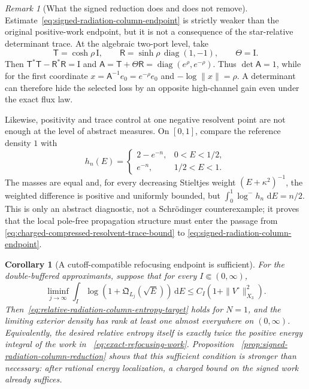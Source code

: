 \documentclass[11pt]{article}
\newcommand{\Id}{\mathrm I}
\newcommand{\dd}{\,\mathrm d}
\newtheorem{corollary}[theorem]{Corollary}
\theoremstyle{definition}
\theoremstyle{remark}
\newtheorem{remark}[theorem]{Remark}
\begin{document}
\begin{remark}[What the signed reduction does and does not remove]
\label{rem:signed-vector-versus-determinant}
Estimate~\eqref{eq:signed-radiation-column-endpoint} is strictly weaker than
the original positive-work endpoint, but it is not a consequence of the
star-relative determinant trace.  At the algebraic two-port level, take
\begin{equation}
 \mathsf T=\cosh\rho\,\Id,
 \qquad
 \mathsf R=\sinh\rho\,\operatorname{diag}(1,-1),
 \qquad \Theta=\Id.
\end{equation}
Then $\mathsf T^*\mathsf T-\mathsf R^*\mathsf R=\Id$ and
$\mathsf A=\mathsf T+\Theta\mathsf R=\operatorname{diag}(e^\rho,e^{-\rho})$.
Thus $\det\mathsf A=1$, while for the first coordinate
$x=\mathsf A^{-1}e_0=e^{-\rho}e_0$ and
$-\log\|x\|=\rho$.  A determinant can therefore hide the selected loss by an
opposite high-channel gain even under the exact flux law.

Likewise, positivity and trace control at one negative resolvent point are not
enough at the level of abstract measures.  On $[0,1]$, compare the reference
density $1$ with
\begin{equation}
 h_n(E)=
 \begin{cases}
  2-e^{-n},&0<E<1/2,\\
  e^{-n},&1/2<E<1.
 \end{cases}
\end{equation}
The masses are equal and, for every decreasing Stieltjes weight
$(E+\kappa^2)^{-1}$, the weighted difference is positive and uniformly
bounded, but $\int_0^1\log^-h_n\,\dd E=n/2$.  This is only an abstract
diagnostic, not a Schr\"odinger counterexample; it proves that the local
pole-free propagation structure must enter the passage from
\eqref{eq:charged-compressed-resolvent-trace-bound} to
\eqref{eq:signed-radiation-column-endpoint}.
\end{remark}

\begin{corollary}[A cutoff-compatible refocusing endpoint is sufficient]
\label{cor:reciprocal-refocusing-endpoint}
For the double-buffered approximants, suppose that for every
$I\Subset(0,\infty)$,
\begin{equation}
 \liminf_{j\to\infty}\int_I
  \log\!\left(1+\mathfrak Q_{L_j}(\sqrt E)\right)\dd E
 \leq C_I\left(1+\|V^\circ\|_{X_3}^2\right).
 \label{eq:reciprocal-refocusing-endpoint}
\end{equation}
Then~\eqref{eq:relative-radiation-column-entropy-target} holds for $N=1$, and
the limiting exterior density has rank at least one almost everywhere on
$(0,\infty)$.  Equivalently, the desired relative entropy itself is exactly
twice the positive energy integral of the work in
~\eqref{eq:exact-refocusing-work}.  Proposition
~\ref{prop:signed-radiation-column-reduction} shows that this sufficient
condition is stronger than necessary: after rational energy localization, a
charged bound on the \emph{signed} work already suffices.
\end{corollary}
\end{document}
